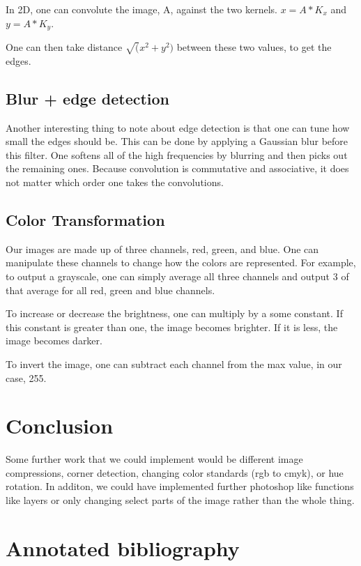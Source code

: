 \documentclass[11pt]{article}
\begin{document}
In 2D, one can convolute the image, A, against the two kernels. $x = A*K_x$ and $y=A*K_y$. 

One can then take distance $\sqrt(x^2+y^2)$ between these two values, to get the edges. 


\subsection{Blur + edge detection}
Another interesting thing to note about edge detection is that one can tune how small the edges should be. This can be done by applying a Gaussian blur before this filter. One softens all of the high frequencies by blurring and then picks out the remaining ones. 
Because convolution is commutative and associative, it does not matter which order one takes the convolutions.

\subsection{Color Transformation}
Our images are made up of three channels, red, green, and blue. One can manipulate these channels to change how the colors are represented. For example, to output a grayscale, one can simply average all three channels and output 3 of that average for all red, green and blue channels.

To increase or decrease the brightness, one can multiply by a some constant. If this constant is greater than one, the image becomes brighter. If it is less, the image becomes darker. 

To invert the image, one can subtract each channel from the max value, in our case, 255.





\section{Conclusion}
Some further work that we could implement would be different image compressions, corner detection, changing color standards (rgb to cmyk), or hue rotation. In additon, we could have implemented further photoshop like
functions like layers or only changing select parts of the image rather than the whole thing.

\section{Annotated bibliography}
\end{document}

